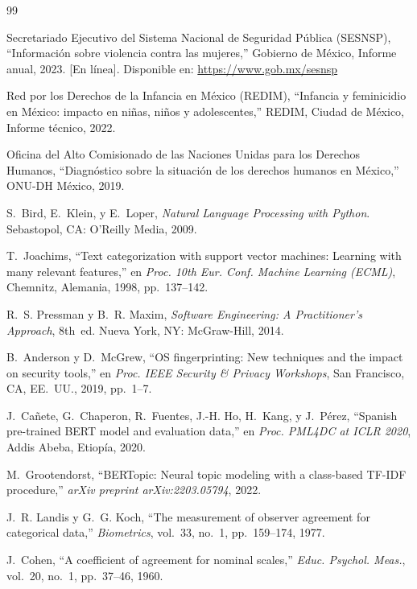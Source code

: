 \documentclass[conference]{IEEEtran}
\begin{document}
\begin{thebibliography}{99}

Secretariado Ejecutivo del Sistema Nacional de Seguridad P\'{u}blica
(SESNSP), ``Informaci\'{o}n sobre violencia contra las mujeres,'' Gobierno
de M\'{e}xico, Informe anual, 2023. [En l\'{i}nea]. Disponible en:
\url{https://www.gob.mx/sesnsp}

Red por los Derechos de la Infancia en M\'{e}xico (REDIM), ``Infancia y
feminicidio en M\'{e}xico: impacto en ni\~{n}as, ni\~{n}os y
adolescentes,'' REDIM, Ciudad de M\'{e}xico, Informe t\'{e}cnico, 2022.

Oficina del Alto Comisionado de las Naciones Unidas para los Derechos
Humanos, ``Diagn\'{o}stico sobre la situaci\'{o}n de los derechos humanos
en M\'{e}xico,'' ONU-DH M\'{e}xico, 2019.

S.~Bird, E.~Klein, y E.~Loper, \textit{Natural Language Processing with
Python}. Sebastopol, CA: O'Reilly Media, 2009.

T.~Joachims, ``Text categorization with support vector machines: Learning
with many relevant features,'' en \textit{Proc. 10th Eur. Conf. Machine
Learning (ECML)}, Chemnitz, Alemania, 1998, pp.~137--142.

R.~S. Pressman y B.~R. Maxim, \textit{Software Engineering: A
Practitioner's Approach}, 8th~ed. Nueva York, NY: McGraw-Hill, 2014.

B.~Anderson y D.~McGrew, ``OS fingerprinting: New techniques and the
impact on security tools,'' en \textit{Proc. IEEE Security \& Privacy
Workshops}, San Francisco, CA, EE.~UU., 2019, pp.~1--7.

J.~Ca\~{n}ete, G.~Chaperon, R.~Fuentes, J.-H. Ho, H.~Kang, y J.~P\'{e}rez,
``Spanish pre-trained BERT model and evaluation data,'' en \textit{Proc.
PML4DC at ICLR 2020}, Addis Abeba, Etiop\'{i}a, 2020.

M.~Grootendorst, ``BERTopic: Neural topic modeling with a class-based
TF-IDF procedure,'' \textit{arXiv preprint arXiv:2203.05794}, 2022.

J.~R. Landis y G.~G. Koch, ``The measurement of observer agreement for
categorical data,'' \textit{Biometrics}, vol.~33, no.~1, pp.~159--174,
1977.

J.~Cohen, ``A coefficient of agreement for nominal scales,''
\textit{Educ. Psychol. Meas.}, vol.~20, no.~1, pp.~37--46, 1960.

\end{thebibliography}
\end{document}

